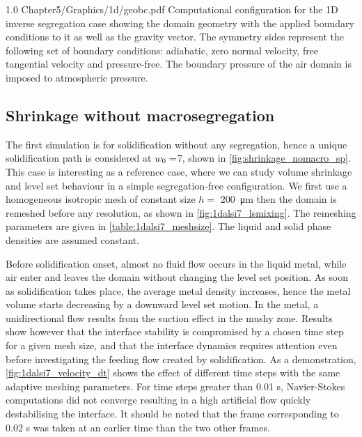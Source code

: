 \begin{figureth}
{1.0}
{Chapter5/Graphics/1d/geobc.pdf}
{Computational configuration for the 1D inverse segregation case showing the domain geometry 
with the applied boundary conditions to it as well as the gravity vector.
The symmetry sides represent the following set of boundary conditions: 
adiabatic, zero normal velocity, free tangential velocity and pressure-free.
The boundary pressure of the air domain is imposed to atmospheric pressure.}
\label{fig:1d_alsi7_geobc}
\end{figureth}

%
\subsection{Shrinkage without macrosegregation}

The first simulation is for solidification without any segregation, hence a unique solidification path is considered at ${w}_0=$\SI{7}{\ucomposition},
shown in \cref{fig:shrinkage_nomacro_sp}.
This case is interesting as a reference case, where we can study volume shrinkage and level set behaviour in a simple segregation-free configuration.
We first use a homogeneous isotropic mesh of constant size $h=$ \SI{200}{\micro \metre} then the domain is remeshed before any resolution, 
as shown in \cref{fig:1dalsi7_lsmixing}. The remeshing parameters are given in \cref{table:1dalsi7_meshsize}.
The liquid and solid phase densities are assumed constant.

Before solidification onset, almost no fluid flow occurs in the liquid metal, while air enter and leaves the domain without
changing the level set position. As soon as solidification takes place, the average metal density increases, hence
the metal volume starts decreasing by a downward level set motion. In the metal, a unidirectional flow results from
the suction effect in the mushy zone. 
Results show however that the interface stability is compromised by a chosen time step for a given mesh size, and that the interface dynamics
requires attention even before investigating the feeding flow created by solidification. As a demonstration, \cref{fig:1dalsi7_velocity_dt} shows the effect of different
time steps with the same adaptive meshing parameters. For time steps greater than 0.01 s, Navier-Stokes computations did not converge resulting in a high artificial 
flow quickly destabilising the interface. It should be noted that the frame corresponding to 0.02 s was taken at an earlier time than the two other frames.

